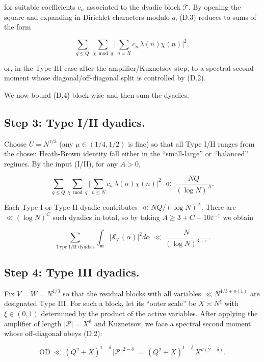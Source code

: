 \documentclass[11pt]{article}
\theoremstyle{definition}
\theoremstyle{remark}
\begin{document}
for suitable coefficients $c_n$ associated to the dyadic block $\mathcal T$. By opening the square and expanding in Dirichlet characters modulo $q$, (D.3) reduces to sums of the form

\begin{equation}
\sum_{q\le Q}\ \sum_{\chi\bmod q}
\Big|\sum_{n\asymp X} c_n\,\lambda(n)\chi(n)\Big|^2,
\tag{D.4}
\end{equation}

or, in the Type-III case after the amplifier/Kuznetsov step, to a spectral second moment whose diagonal/off-diagonal split is controlled by (D.2).

We now bound (D.4) block-wise and then sum the dyadics.


\subsection*{Step 3: Type I/II dyadics.}
Choose $U=N^{1/3}$ (any $\mu\in(1/4,1/2)$ is fine) so that all Type I/II ranges from the chosen Heath-Brown identity fall either in the “small-large” or “balanced” regimes. By the input (I/II), for any $A>0$,

$$
\sum_{q\le Q}\sum_{\chi\bmod q}
\Big|\sum_{n\le N} c_n\,\lambda(n)\chi(n)\Big|^2
\ \ll\ \frac{NQ}{(\log N)^A}.
$$

Each Type I or Type II dyadic contributes $\ll NQ/(\log N)^A$. There are $\ll(\log N)^C$ such dyadics in total, so by taking $A\ge 3+C+10\varepsilon^{-1}$ we obtain

\begin{equation}
\sum_{\text{Type I/II dyadics}}
\int_{\mathfrak m}\big|\mathcal S_{\mathcal T}(\alpha)\big|^2 d\alpha
\ \ll\ \frac{N}{(\log N)^{3+\varepsilon}}.
\tag{D.5}
\end{equation}

\subsection*{Step 4: Type III dyadics.}
Fix $V=W=N^{1/3}$ so that the residual blocks with all variables $\ll N^{1/3+o(1)}$ are designated Type III. For such a block, let its “outer scale” be $X\asymp N^\xi$ with $\xi\in(0,1)$ determined by the product of the active variables. After applying the amplifier of length $|\mathcal P|=X^\vartheta$ and Kuznetsov, we face a spectral second moment whose off-diagonal obeys (D.2):

$$
\mathrm{OD}\ \ll\ (Q^2+X)^{1-\delta}\,|\mathcal P|^{\,2-\delta}
\ =\ (Q^2+X)^{1-\delta}\,X^{\vartheta(2-\delta)}.
$$
\end{document}

